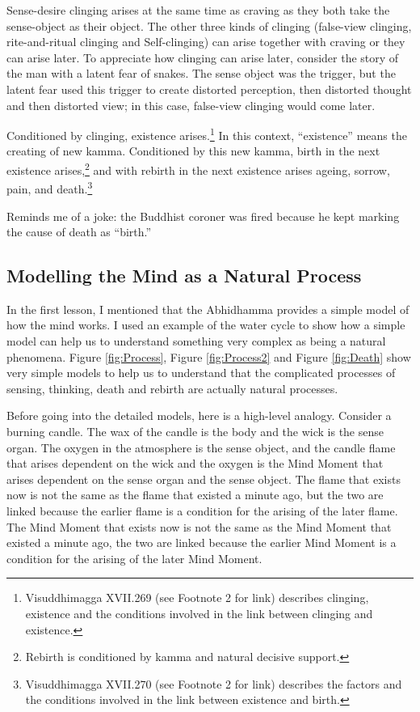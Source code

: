 Sense-desire clinging arises at the same time as craving as they both take the sense-object as their object. The other three kinds of clinging (false-view clinging, rite-and-ritual clinging and Self-clinging) can arise together with craving or they can arise later. To appreciate how clinging can arise later, consider the story of the man with a latent fear of snakes. The sense object was the trigger, but the latent fear used this trigger to create distorted perception, then distorted thought and then distorted view; in this case, false-view clinging would come later.

Conditioned by clinging, existence arises.\footnote{Visuddhimagga XVII.269 (see Footnote 2 for link) describes clinging, existence and the conditions involved in the link between clinging and existence.} In this context, “existence” means the creating of new kamma. Conditioned by this new kamma, birth in the next existence arises,\footnote{Rebirth is conditioned by kamma and natural decisive support.} and with rebirth in the next existence arises ageing, sorrow, pain, and death.\footnote{Visuddhimagga XVII.270 (see Footnote 2 for link) describes the factors and the conditions involved in the link between existence and birth.} 

Reminds me of a joke: the Buddhist coroner was fired because he kept marking the cause of death as “birth.” 

\subsection*{Modelling the Mind as a Natural Process}

In the first lesson, I mentioned that the Abhidhamma provides a simple model of how the mind works. I used an example of the water cycle to show how a simple model can help us to understand something very complex as being a natural phenomena. Figure \ref{fig:Process}, Figure \ref{fig:Process2} and Figure \ref{fig:Death} show very simple models to help us to understand that the complicated processes of sensing, thinking, death and rebirth are actually natural processes.

Before going into the detailed models, here is a high-level analogy. Consider a burning candle. The wax of the candle is the body and the wick is the sense organ. The oxygen in the atmosphere is the sense object, and the candle flame that arises dependent on the wick and the oxygen is the Mind Moment that arises dependent on the sense organ and the sense object. The flame that exists now is not the same as the flame that existed a minute ago, but the two are linked because the earlier flame is a condition for the arising of the later flame. The Mind Moment that exists now is not the same as the Mind Moment that existed a minute ago, the two are linked because the earlier Mind Moment is a condition for the arising of the later Mind Moment. 

